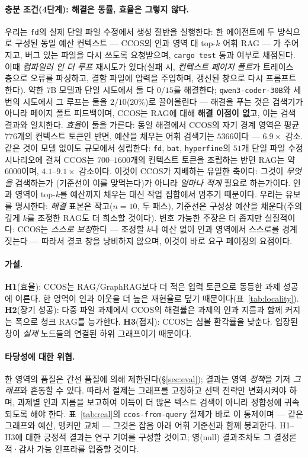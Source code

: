 \documentclass[11pt]{article}
\newcommand{\code}[1]{\texttt{#1}}
\begin{document}
\paragraph{충분 조건(4단계): 해결은 동률, 효율은 그렇지 않다.} 우리는 \code{fd}의 실제 단일 파일 수정에서 생성
절반을 실행한다: 한 에이전트에 두 방식으로 구성된 동일 예산 컨텍스트 --- CCOS의 인과 영역 대 top-$k$ 어휘 RAG --- 가
주어지고, 버그 있는 파일을 다시 쓰도록 요청받으며, \code{cargo test} 통과 여부로 채점된다. 이때 \emph{컴파일러 인 더
루프} 재시도가 있다(실패 시, \emph{컨텍스트 페이지 폴트}가 트레이스 층으로 오류를 파싱하고, 결함 파일에 압력을 주입하며,
갱신된 창으로 다시 프롬프트한다). 약한 $7$B 모델과 단일 시도에서 둘 다 $0/15$를 해결한다; \code{qwen3-coder-30B}와 세
번의 시도에서 그 루프는 둘을 $2/10$($20\%$)로 끌어올린다 --- 해결을 푸는 것은 검색기가 아니라 페이지 폴트 피드백이며,
CCOS는 RAG에 대해 \textbf{해결 이점이 없}고, 이는 검색 결과와 일치한다. \emph{효율}이 둘을 가른다: 동일 해결에서
CCOS의 자기 경계 영역은 평균 $776$개의 컨텍스트 토큰인 반면, 예산을 채우는 어휘 검색기는 $5366$이다 ---
$\mathbf{6.9\times}$ 감소. 같은 것이 모델 없이도 규모에서 성립한다: \code{fd}, \code{bat}, \code{hyperfine}의
$51$개 단일 파일 수정 시나리오에 걸쳐 CCOS는 $700$--$1600$개의 컨텍스트 토큰을 조립하는 반면 RAG는 약 $6000$이며,
$\mathbf{4.1}$--$\mathbf{9.1\times}$ 감소이다. 이것이 CCOS가 지배하는 유일한 축이다: 그것이 \emph{무엇을} 검색하는가
(기준선이 이를 맞먹는다)가 아니라 \emph{얼마나 적게} 필요로 하는가이다. 인과 영역이 top-$k$를 예산까지 채우는 대신 작업
집합에서 멈추기 때문이다. 우리는 유보를 명시한다: \emph{해결} 표본은 작고($n{=}10$, 두 패스), 기준선은 구성상 예산을
채운다(주의 깊게 $k$를 조정한 RAG도 더 희소할 것이다). 변호 가능한 주장은 더 좁지만 실질적이다: CCOS는 \emph{스스로
보정}한다 --- 조정할 $k$나 예산 없이 인과 영역에서 스스로를 경계 짓는다 --- 따라서 결코 창을 낭비하지 않으며, 이것이
바로 요구 페이징의 요점이다.

\paragraph{가설.}
\textbf{H1}(효율): CCOS는 RAG/GraphRAG보다 더 적은 입력 토큰으로 동등한 과제 성공에 이른다. 한 영역이 인과 이웃을 더
높은 재현율로 덮기 때문이다(표~\ref{tab:locality}).
\textbf{H2}(장기 성공): 다중 파일 과제에서 CCOS의 해결률은 과제의 인과 지름과 함께 커지는 폭으로 청크 RAG를 능가한다.
\textbf{H3}(접지): CCOS는 심볼 환각률을 낮춘다. 입장된 창이 \emph{실제} 노드들의 연결된 하위 그래프이기 때문이다.

\paragraph{타당성에 대한 위협.} 한 영역의 품질은 간선 품질에 의해 제한된다(\S\ref{sec:eval}); 결과는 영역 \emph{정책}을
기저 \emph{그래프}와 혼동할 수 있다. 따라서 절제는 그래프를 고정하고 선택 전략만 변화시켜야 하며, 과제별 인과 지름을
보고하여 이득이 더 많은 텍스트 검색이 아니라 정합성에 귀속되도록 해야 한다. 표~\ref{tab:real}의 \code{ccos-from-query}
절제가 바로 이 통제이며 --- 같은 그래프와 예산, 앵커만 교체 --- 그것은 잡음 아래 어휘 기준선과 함께 붕괴한다. H1--H3에
대한 긍정적 결과는 연구 기여를 구성할 것이고; 영(null) 결과조차도 그 결정론적·감사 가능 인프라를 입증할 것이다.
\end{document}

